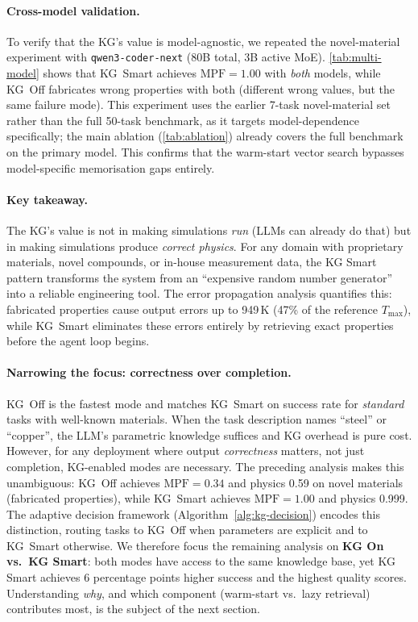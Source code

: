 \documentclass[twocolumn]{article}
\begin{document}
\paragraph{Cross-model validation.}
To verify that the KG's value is model-agnostic, we repeated the
novel-material experiment with \texttt{qwen3-coder-next} (80B total,
3B active MoE).  \cref{tab:multi-model} shows that KG~Smart achieves
$\text{MPF}{=}1.00$ with \emph{both} models, while KG~Off fabricates
wrong properties with both (different wrong values, but the same
failure mode).  This experiment uses the earlier 7-task novel-material
set rather than the full 50-task benchmark, as it targets
model-dependence specifically; the main ablation (\cref{tab:ablation})
already covers the full benchmark on the primary model.
This confirms that the warm-start vector search
bypasses model-specific memorisation gaps entirely.



\paragraph{Key takeaway.}
The KG's value is not in making simulations \emph{run} (LLMs can
already do that) but in making simulations produce
\emph{correct physics}.  For any domain with proprietary materials,
novel compounds, or in-house measurement data, the KG Smart pattern
transforms the system from an ``expensive random number generator''
into a reliable engineering tool.  The error propagation analysis
quantifies this: fabricated properties cause output errors up to
949\,K (47\% of the reference $T_{\max}$), while KG~Smart eliminates
these errors entirely by retrieving exact properties before the agent
loop begins.

\paragraph{Narrowing the focus: correctness over completion.}
KG~Off is the fastest mode and matches KG~Smart on success rate for
\emph{standard} tasks with well-known materials.  When the task
description names ``steel'' or ``copper'', the LLM's parametric
knowledge suffices and KG overhead is pure cost.  However, for any
deployment where output \emph{correctness} matters, not just
completion, KG-enabled modes are necessary.  The preceding analysis
makes this unambiguous: KG~Off achieves $\text{MPF}{=}0.34$ and
physics 0.59 on novel materials (fabricated properties), while
KG~Smart achieves $\text{MPF}{=}1.00$ and physics 0.999.
The adaptive decision framework (Algorithm~\ref{alg:kg-decision})
encodes this distinction, routing tasks to KG~Off when
parameters are explicit and to KG~Smart otherwise.  We therefore focus
the remaining analysis on \textbf{KG On vs.\ KG Smart}: both modes
have access to the same knowledge base, yet KG Smart achieves 6
percentage points higher success and the highest quality scores.
Understanding \emph{why}, and which component (warm-start vs.\ lazy
retrieval) contributes most, is the subject of the next section.
\end{document}
